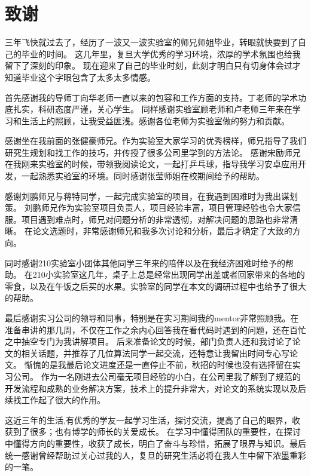 \chapter{致谢}

三年飞快就过去了，经历了一波又一波实验室的师兄师姐毕业，转眼就快要到了自己的毕业的时间。 
这几年里，复旦大学优秀的学习环境，浓厚的学术氛围也给我留下了深刻的印象。
现在迎来了自己的毕业时刻，此刻才明白只有切身体会过才知道毕业这个字眼包含了太多太多情感。

首先感谢我的导师丁向华老师一直以来的包容和工作方面的支持。丁老师的学术功底扎实，科研态度严谨，关心学生。
同样感谢实验室顾老师和卢老师三年来在学习和生活上的照顾，让我受益匪浅。感谢各位老师为实验室做的努力和贡献。

感谢坐在我前面的张健豪师兄。作为实验室大家学习的优秀榜样，师兄指导了我们研究生规划和找工作的技巧，并传授了很多公司里学到的方法论。
感谢宋励师兄在我刚来实验室的时候，带领我阅读论文，一起打乒乓球，指导我学习安卓应用开发，一起熟悉实验室的环境。同时感谢张莹师姐在校期间给予的帮助。

感谢刘鹏师兄与蒋特同学，一起完成实验室的项目，在我遇到困难时为我出谋划策。
刘鹏师兄作为实验室项目负责人，项目经验丰富，项目管理经验也令大家信服。项目遇到难点时，师兄对问题分析的非常透彻，对解决问题的思路也非常清晰。
在论文选题时，非常感谢师兄和我多次讨论和分析，最后才确定了大致的方向。

同时感谢210实验室小团体其他同学三年来的陪伴以及在我经济困难时给予的帮助。
在210小实验室这几年，桌子上总是经常出现同学出差或者回家带来的各地的零食，以及在午饭之后买的水果。实验室的同学在本文的调研过程中也给予了很大的帮助。

最后感谢实习公司的领导和同事，特别是在实习期间我的mentor非常照顾我。在准备串讲的那几周，不仅在工作之余内心回答我在看代码时遇到的问题，还在百忙之中抽空专门为我讲解项目。
后来准备论文的时候，部门负责人还和我讨论了论文的相关话题，并推荐了几位算法同学一起交流，还特意让我留出时间专心写论文。
惭愧的是我最后论文进度还是一直停止不前，秋招的时候也没有选择留在实习公司。
作为一名刚进去公司毫无项目经验的小白，在公司里我了解到了规范的开发流程和成熟的业务解决方案，技术上的提升非常大，对论文的系统实现以及后续找工作起了很大的作用。



这近三年的生活,有优秀的学友一起学习生活，探讨交流，提高了自己的眼界，收获到了很多；也有博学的师长的关爱成长。
在学习中懂得团队的重要性，在探讨中懂得方向的重要性，收获了成长，明白了奋斗与珍惜，拓展了眼界与知识。最后统一感谢曾经帮助过关心过我的人，复旦的研究生活必将在我人生中留下浓墨重彩的一笔。